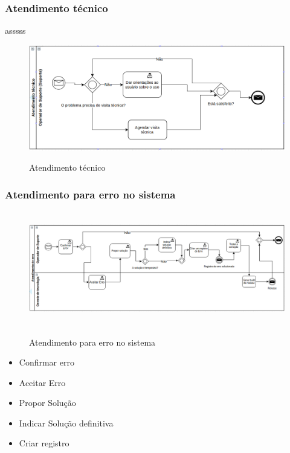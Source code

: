 \documentclass[11pt,a4paper]{article}
\begin{document}
\subsubsection{Atendimento técnico}
asssss
\begin{figure}[!h]
\caption{Atendimento técnico}
\centering %
\includegraphics[width=15cm]{as-is/02_suporte_tecnico.png}
\label{figura:suporte_tecnico_as_is}
\end{figure}

\subsubsection{Atendimento para erro no sistema}

\begin{figure}[!h]
\caption{Atendimento para erro no sistema}
\centering %
\includegraphics[width=16cm, height=5cm]{as-is/03_atendimento_de_erro.png}
\label{figura:atendimento_de_erro_as_is}
\end{figure}
\begin{itemize}
	\item Confirmar erro
	\item Aceitar Erro
	\item Propor Solução
	\item Indicar Solução definitiva
	\item Criar registro
\end{itemize}
\end{document}
